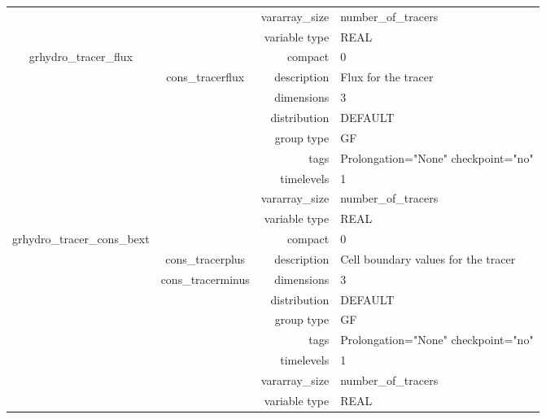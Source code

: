 \documentclass{article}
\begin{document}
\begin{tabular*}{150mm}{|c|c@{\extracolsep{\fill}}|rl|}
 &  & vararray\_size & number\_of\_tracers \\ 
 &  & variable type & REAL \\ 
\hline 
grhydro\_tracer\_flux &  & compact & 0 \\ 
 & cons\_tracerflux & description & Flux for the tracer \\ 
 &  & dimensions & 3 \\ 
 &  & distribution & DEFAULT \\ 
 &  & group type & GF \\ 
 &  & tags & Prolongation="None" checkpoint="no" \\ 
 &  & timelevels & 1 \\ 
 &  & vararray\_size & number\_of\_tracers \\ 
 &  & variable type & REAL \\ 
\hline 
grhydro\_tracer\_cons\_bext &  & compact & 0 \\ 
 & cons\_tracerplus & description & Cell boundary values for the tracer \\ 
 & cons\_tracerminus & dimensions & 3 \\ 
 &  & distribution & DEFAULT \\ 
 &  & group type & GF \\ 
 &  & tags & Prolongation="None" checkpoint="no" \\ 
 &  & timelevels & 1 \\ 
 &  & vararray\_size & number\_of\_tracers \\ 
 &  & variable type & REAL \\ 
\hline 
\end{tabular*} 



\vspace{5mm}
\vspace{5mm}
\end{document}
